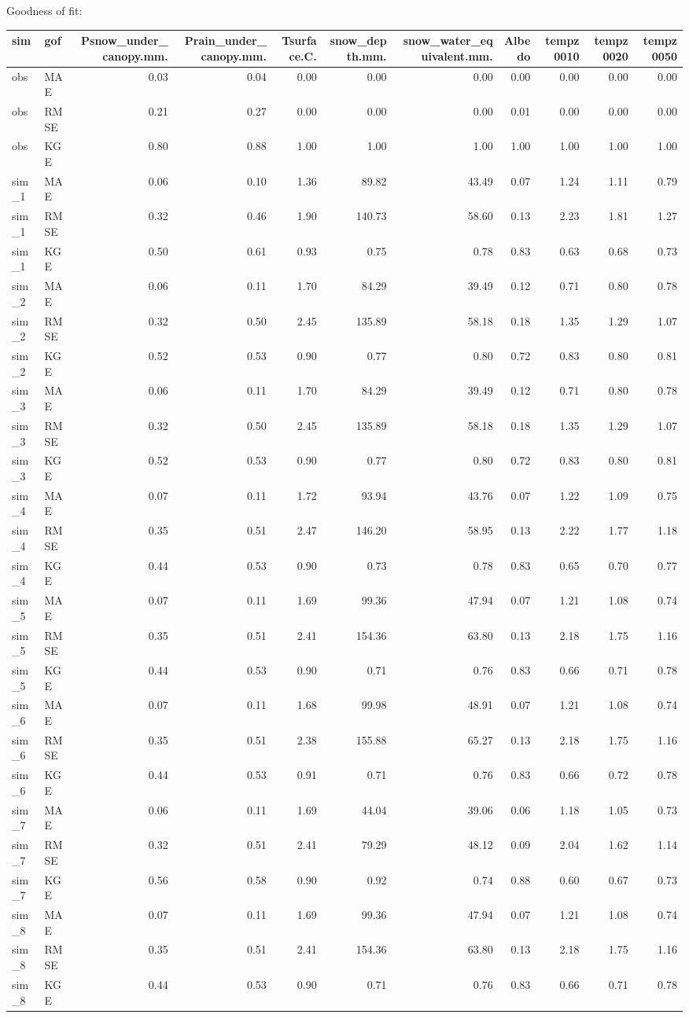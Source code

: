 \documentclass[
]{article}
\begin{document}
Goodness of fit:

\begin{longtable}[]{@{}llrrrrrrrrr@{}}
\toprule
sim & gof & Psnow\_under\_canopy.mm. & Prain\_under\_canopy.mm. &
Tsurface.C. & snow\_depth.mm. & snow\_water\_equivalent.mm. & Albedo &
tempz0010 & tempz0020 & tempz0050\tabularnewline
\midrule
\endhead
obs & MAE & 0.03 & 0.04 & 0.00 & 0.00 & 0.00 & 0.00 & 0.00 & 0.00 &
0.00\tabularnewline
obs & RMSE & 0.21 & 0.27 & 0.00 & 0.00 & 0.00 & 0.01 & 0.00 & 0.00 &
0.00\tabularnewline
obs & KGE & 0.80 & 0.88 & 1.00 & 1.00 & 1.00 & 1.00 & 1.00 & 1.00 &
1.00\tabularnewline
sim\_1 & MAE & 0.06 & 0.10 & 1.36 & 89.82 & 43.49 & 0.07 & 1.24 & 1.11 &
0.79\tabularnewline
sim\_1 & RMSE & 0.32 & 0.46 & 1.90 & 140.73 & 58.60 & 0.13 & 2.23 & 1.81
& 1.27\tabularnewline
sim\_1 & KGE & 0.50 & 0.61 & 0.93 & 0.75 & 0.78 & 0.83 & 0.63 & 0.68 &
0.73\tabularnewline
sim\_2 & MAE & 0.06 & 0.11 & 1.70 & 84.29 & 39.49 & 0.12 & 0.71 & 0.80 &
0.78\tabularnewline
sim\_2 & RMSE & 0.32 & 0.50 & 2.45 & 135.89 & 58.18 & 0.18 & 1.35 & 1.29
& 1.07\tabularnewline
sim\_2 & KGE & 0.52 & 0.53 & 0.90 & 0.77 & 0.80 & 0.72 & 0.83 & 0.80 &
0.81\tabularnewline
sim\_3 & MAE & 0.06 & 0.11 & 1.70 & 84.29 & 39.49 & 0.12 & 0.71 & 0.80 &
0.78\tabularnewline
sim\_3 & RMSE & 0.32 & 0.50 & 2.45 & 135.89 & 58.18 & 0.18 & 1.35 & 1.29
& 1.07\tabularnewline
sim\_3 & KGE & 0.52 & 0.53 & 0.90 & 0.77 & 0.80 & 0.72 & 0.83 & 0.80 &
0.81\tabularnewline
sim\_4 & MAE & 0.07 & 0.11 & 1.72 & 93.94 & 43.76 & 0.07 & 1.22 & 1.09 &
0.75\tabularnewline
sim\_4 & RMSE & 0.35 & 0.51 & 2.47 & 146.20 & 58.95 & 0.13 & 2.22 & 1.77
& 1.18\tabularnewline
sim\_4 & KGE & 0.44 & 0.53 & 0.90 & 0.73 & 0.78 & 0.83 & 0.65 & 0.70 &
0.77\tabularnewline
sim\_5 & MAE & 0.07 & 0.11 & 1.69 & 99.36 & 47.94 & 0.07 & 1.21 & 1.08 &
0.74\tabularnewline
sim\_5 & RMSE & 0.35 & 0.51 & 2.41 & 154.36 & 63.80 & 0.13 & 2.18 & 1.75
& 1.16\tabularnewline
sim\_5 & KGE & 0.44 & 0.53 & 0.90 & 0.71 & 0.76 & 0.83 & 0.66 & 0.71 &
0.78\tabularnewline
sim\_6 & MAE & 0.07 & 0.11 & 1.68 & 99.98 & 48.91 & 0.07 & 1.21 & 1.08 &
0.74\tabularnewline
sim\_6 & RMSE & 0.35 & 0.51 & 2.38 & 155.88 & 65.27 & 0.13 & 2.18 & 1.75
& 1.16\tabularnewline
sim\_6 & KGE & 0.44 & 0.53 & 0.91 & 0.71 & 0.76 & 0.83 & 0.66 & 0.72 &
0.78\tabularnewline
sim\_7 & MAE & 0.06 & 0.11 & 1.69 & 44.04 & 39.06 & 0.06 & 1.18 & 1.05 &
0.73\tabularnewline
sim\_7 & RMSE & 0.32 & 0.51 & 2.41 & 79.29 & 48.12 & 0.09 & 2.04 & 1.62
& 1.14\tabularnewline
sim\_7 & KGE & 0.56 & 0.58 & 0.90 & 0.92 & 0.74 & 0.88 & 0.60 & 0.67 &
0.73\tabularnewline
sim\_8 & MAE & 0.07 & 0.11 & 1.69 & 99.36 & 47.94 & 0.07 & 1.21 & 1.08 &
0.74\tabularnewline
sim\_8 & RMSE & 0.35 & 0.51 & 2.41 & 154.36 & 63.80 & 0.13 & 2.18 & 1.75
& 1.16\tabularnewline
sim\_8 & KGE & 0.44 & 0.53 & 0.90 & 0.71 & 0.76 & 0.83 & 0.66 & 0.71 &
0.78\tabularnewline
\bottomrule
\end{longtable}
\end{document}
